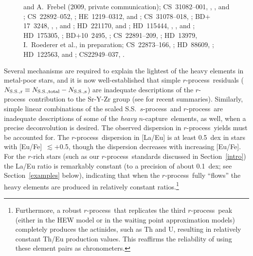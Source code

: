 \documentclass{emulateapj}
\def\rpro{\mbox{$r$-process}}
\def\spro{\mbox{$s$-process}}
\def\ncap{\mbox{$n$-capture}}
\begin{document}
\begin{figure}
{   and A.\ Frebel (2009, private communication);
\mbox{CS~31082--001}, \citet{hill02}, \citet{plez04}, and \citet{sneden09};
\mbox{CS~22892--052}, \citet{sneden03,sneden09};
\mbox{HE~1219--0312}, \citet{hayek09} and \citet{roederer09b};
\mbox{CS~31078--018}, \citet{lai08};
\mbox{BD$+$17~3248}, \citet{cowan02}, \citet{roederer09b}, 
   and \citet{sneden09};
\mbox{HD~221170}, \citet{ivans06} and \citet{sneden09};
\mbox{HD~115444}, \citet{westin00}, \citet{roederer09b}, and \citet{sneden09};
\mbox{HD~175305}, \citet{roederer10a};
\mbox{BD$+$10~2495}, \citet{roederer10a};
\mbox{CS~22891--209}, \citet{francois07};
\mbox{HD~13979}, I.\ Roederer et al., in preparation;
\mbox{CS~22873--166}, \citet{francois07};
\mbox{HD~88609}, \citet{honda07};
\mbox{HD~122563}, \citet{honda06} and \citet{roederer10b};
\mbox{CS22949--037}, \citet{depagne02}.
}
\end{figure}

Several mechanisms are required to explain the lightest of the
heavy elements in metal-poor stars, and it is now
well-established that simple \rpro\ residuals 
($N_{\rm S.S., r} \equiv N_{\rm S.S., total} - N_{\rm S.S., s}$)
are inadequate descriptions of the 
\rpro\ contribution to the Sr-Y-Zr group
(see \citealt{qian07,qian08} for recent summaries).
Similarly, simple
linear combinations of the scaled S.S.\ \spro\ and \rpro\ are inadequate 
descriptions of some of the \textit{heavy} \ncap\ elements, as well,
when a precise deconvolution is desired.
The observed dispersion in \rpro\ yields must be accounted for.
The \rpro\ dispersion in [La/Eu] is at least 0.5~dex in stars
with [Eu/Fe]~$\lesssim +$0.5,
though the dispersion decreases with increasing [Eu/Fe].
For the $r$-rich stars 
(such as our \rpro\ standards discussed in Section~\ref{intro})
the La/Eu ratio is remarkably constant 
(to a precision of about 0.1~dex; see Section~\ref{examples} below), 
indicating that 
when the \rpro\ fully ``flows'' the heavy elements are produced
in relatively constant ratios.\footnote{
Furthermore, a robust \rpro\ that replicates the third \rpro\ peak
(either in the HEW model or in the waiting point approximation models)
completely produces the actinides, such as Th and U, 
resulting in relatively constant Th/Eu production values.
This reaffirms the reliability of using these element pairs as chronometers.}
\end{document}
